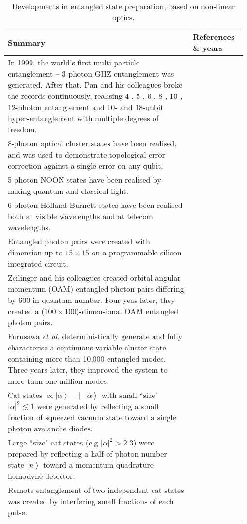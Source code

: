 \begin{table*}[!htbp]
	\begin{tabular}{|p{0.755\linewidth}|p{0.22\linewidth}|}
		\hline
	\textbf{Summary} & \textbf{References \& years} \\	\hline \hline
        In 1999, the world's first multi-particle entanglement -- 3-photon GHZ entanglement was generated. After that, Pan and his colleagues broke the records continuously, realising 4-, 5-, 6-, 8-, 10-, 12-photon entanglement and 10- and 18-qubit hyper-entanglement with multiple degrees of freedom. & \cite{bib:bouwmeester1999observation, bib:wang201818, bib:zhong201812}  \\
		\hline
		8-photon optical cluster states have been realised, and was used to demonstrate topological error correction against a single error on any qubit. &  \cite{bib:yao2012experimental}  \\
		\hline
		5-photon NOON states have been realised by mixing quantum and classical light. & \cite{bib:afek2010high} \\
		\hline
		6-photon Holland-Burnett states have been realised both at visible wavelengths and at telecom wavelengths. & \cite{bib:xiang2012optimal,  bib:jin2016detection} \\
		\hline
		Entangled photon pairs were created with dimension up to \mbox{$15\times 15$} on a programmable silicon integrated circuit. & \cite{bib:wang2018multidimensional} \\
		\hline
		Zeilinger and his colleagues created orbital angular momentum (OAM) entangled photon pairs differing by 600 in quantum number. Four yeas later, they created a ($100\times 100$)-dimensional OAM entangled photon pairs. & \cite{bib:fickler2012quantum} \\
		\hline
		Furusawa \textit{et al.} deterministically generate and fully characterise a continuous-variable cluster state containing more than 10,000 entangled modes. Three years later, they improved the system to more than one million modes. & \cite{bib:yokoyama2013ultra, bib:yoshikawa2016invited} \\
		\hline
        Cat states $\propto \left| \alpha  \right\rangle  - \left| { - \alpha } \right\rangle $ with small ``size" ${\left| \alpha  \right|^2} \lesssim 1$ were generated by reflecting a small fraction of squeezed vacuum state toward a single photon avalanche diodes. & \cite{bib:neergaard2006generation,  bib:ourjoumtsev2006generating, bib:wakui2007photon} \\
        \hline
        Large ``size" cat states (e.g ${\left| \alpha  \right|^2} > 2.3$) were prepared by reflecting a half of photon number state $\left| n \right\rangle$ toward a momentum quadrature homodyne detector. & \cite{bib:ourjoumtsev2007generation, bib:takahashi2008generation} \\
		\hline
		Remote entanglement of two independent cat states was created by interfering small fractions of each pulse. & \cite{bib:ourjoumtsev2009preparation} \\
		\hline
	\end{tabular}
	\captionspacetab \caption{Developments in entangled state preparation, based on non-linear optics.} \label{tab:entangled_states}
\end{table*}

